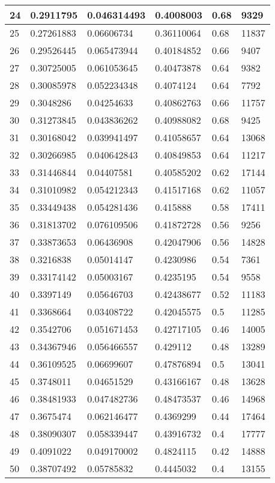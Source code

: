 \begin{longtable}{|l|l|l|l|l|l|}
24 & 0.2911795 & 0.046314493 & 0.4008003 & 0.68 & 9329 \\ \hline 
25 & 0.27261883 & 0.06606734 & 0.36110064 & 0.68 & 11837 \\ \hline 
26 & 0.29526445 & 0.065473944 & 0.40184852 & 0.66 & 9407 \\ \hline 
27 & 0.30725005 & 0.061053645 & 0.40473878 & 0.64 & 9382 \\ \hline 
28 & 0.30085978 & 0.052234348 & 0.4074124 & 0.64 & 7792 \\ \hline 
29 & 0.3048286 & 0.04254633 & 0.40862763 & 0.66 & 11757 \\ \hline 
30 & 0.31273845 & 0.043836262 & 0.40988082 & 0.68 & 9425 \\ \hline 
31 & 0.30168042 & 0.039941497 & 0.41058657 & 0.64 & 13068 \\ \hline 
32 & 0.30266985 & 0.040642843 & 0.40849853 & 0.64 & 11217 \\ \hline 
33 & 0.31446844 & 0.04407581 & 0.40585202 & 0.62 & 17144 \\ \hline 
34 & 0.31010982 & 0.054212343 & 0.41517168 & 0.62 & 11057 \\ \hline 
35 & 0.33449438 & 0.054281436 & 0.415888 & 0.58 & 17411 \\ \hline 
36 & 0.31813702 & 0.076109506 & 0.41872728 & 0.56 & 9256 \\ \hline 
37 & 0.33873653 & 0.06436908 & 0.42047906 & 0.56 & 14828 \\ \hline 
38 & 0.3216838 & 0.05014147 & 0.4230986 & 0.54 & 7361 \\ \hline 
39 & 0.33174142 & 0.05003167 & 0.4235195 & 0.54 & 9558 \\ \hline 
40 & 0.3397149 & 0.05646703 & 0.42438677 & 0.52 & 11183 \\ \hline 
41 & 0.3368664 & 0.03408722 & 0.42045575 & 0.5 & 11285 \\ \hline 
42 & 0.3542706 & 0.051671453 & 0.42717105 & 0.46 & 14005 \\ \hline 
43 & 0.34367946 & 0.056466557 & 0.429112 & 0.48 & 13289 \\ \hline 
44 & 0.36109525 & 0.06699607 & 0.47876894 & 0.5 & 13041 \\ \hline 
45 & 0.3748011 & 0.04651529 & 0.43166167 & 0.48 & 13628 \\ \hline 
46 & 0.38481933 & 0.047482736 & 0.48473537 & 0.46 & 14968 \\ \hline 
47 & 0.3675474 & 0.062146477 & 0.4369299 & 0.44 & 17464 \\ \hline 
48 & 0.38090307 & 0.058339447 & 0.43916732 & 0.4 & 17777 \\ \hline 
49 & 0.4091022 & 0.049170002 & 0.4824115 & 0.42 & 14888 \\ \hline 
50 & 0.38707492 & 0.05785832 & 0.4445032 & 0.4 & 13155 \\ \hline 
\end{longtable}